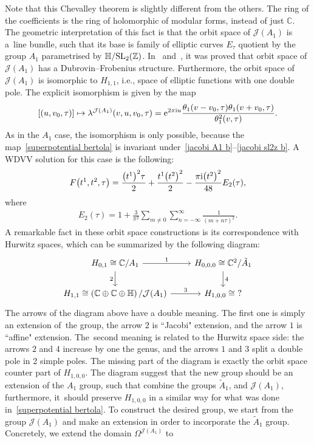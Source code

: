 \documentclass[pdftex]{sigma}%
\numberwithin{equation}{section}
\newcommand{\Ja}{\mathcal{J}}
\begin{document}
Note that this Chevalley theorem is slightly different from the others. The ring of the coefficients is the ring of holomorphic of modular forms, instead of just $\mathbb{C}$. The geometric interpretation of this fact is that the orbit space of $\Ja(A_1)$ is a~line bundle, such that its base is family of elliptic curves $E_{\tau}$ quotient by the group $A_1$ parametrised by $\mathbb{H}/{\rm SL}_2(\mathbb{Z})$. In~\cite{BertolaM.1} and~\cite{BertolaM.2}, it was proved that orbit space of $\Ja(A_1)$ has a Dubrovin--Frobenius structure. Furthermore, the orbit space of $\Ja(A_1)$ is isomorphic to $H_{1,1}$, i.e., space of elliptic functions with one double pole. The explicit isomorphism is given by the map
 \begin{gather}\label{superpotential bertola}
[(u,v_0,\tau)]\mapsto \lambda^{\Ja(A_1)}(v,u,v_0,\tau)={\rm e}^{2\pi {\rm i} u}\frac{\theta_1(v-v_0,\tau)\theta_1(v+v_0,\tau)}{\theta_1^2(v,\tau)}.
\end{gather}
As in the $A_1$ case, the isomorphism is only possible, because the map~\eqref{superpotential bertola} is invariant under~\eqref{jacobi A1 b}--\eqref{jacobi sl2z b}. A WDVV solution for this case is the following:
 \begin{gather}\label{WDVV bertola}
F\big(t^1,t^2,\tau\big)=\frac{\big(t^1\big)^2\tau}{2}+\frac{t^1\big(t^2\big)^2}{2}-\frac{\pi {\rm i}\big(t^2\big)^2}{48}E_2(\tau),
\end{gather}
where
 \begin{gather*}
E_2(\tau)=1+\frac{3}{\pi^2}\sum_{m\neq 0}\sum_{n=-\infty}^{\infty}\frac{1}{(m+n\tau)^2}.
\end{gather*}
A remarkable fact in these orbit space constructions is its correspondence with Hurwitz spaces, which can be summarized by the following diagram:
\[
 \begin{tikzcd}
 H_{0,1}\cong\mathbb{C}/A_1 \arrow{r}{1} \arrow[swap]{d}{2} & H_{0,0,0}\cong\mathbb{C}^2/\tilde A_1 \arrow{d}{4} \\
H_{1,1}\cong\left(\mathbb{C}\oplus\mathbb{C}\oplus\mathbb{H}\right)/\Ja(A_1) \arrow{r}{3}& H_{1,0,0}\cong\ ?
 \end{tikzcd}
\]
The arrows of the diagram above have a double meaning. The first one is simply an extension of~the group, the arrow $2$ is ``Jacobi" extension, and the arrow $1$ is ``affine" extension. The~second meaning is related to the Hurwitz space side: the arrows $2$ and $4$ increase by one the genus, and the arrows $1$ and $3$ split a double pole in 2 simple poles. The missing part of the diagram is exactly the orbit space counter part of $H_{1,0,0}$. The diagram suggest that the new group should be an extension of the $A_1$ group, such that combine the groups $\tilde A_1$, and $\Ja(A_1)$, furthermore, it~should preserve $H_{1,0,0}$ in a similar way for what was done in~\eqref{superpotential bertola}. To construct the desired group, we start from the group $\Ja(A_1)$ and make an extension in order to incorporate the $\tilde A_1$ group. Concretely, we extend the domain $\Omega^{\Ja(A_1)}$ to
\end{document}
